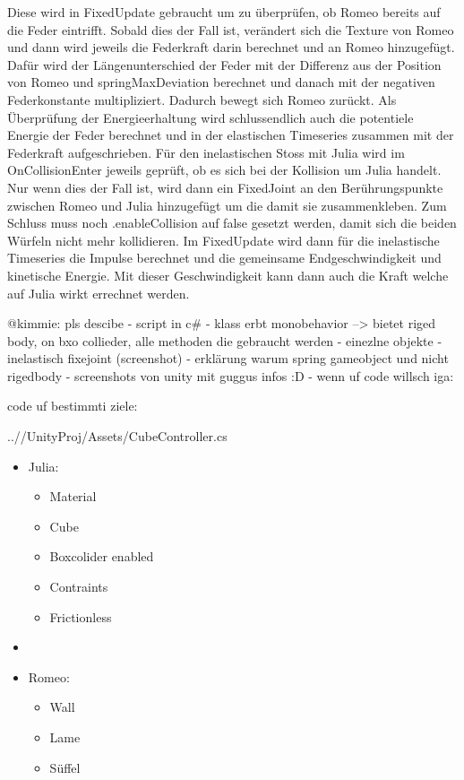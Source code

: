 \documentclass[../main.tex]{subfiles}
\begin{document}
Diese wird in FixedUpdate gebraucht um zu überprüfen, ob Romeo bereits auf die Feder eintrifft.
Sobald dies der Fall ist, verändert sich die Texture von Romeo und dann wird jeweils die Federkraft darin
berechnet und an Romeo hinzugefügt. Dafür wird der Längenunterschied der Feder mit der Differenz aus der
Position von Romeo und springMaxDeviation berechnet und danach mit der negativen Federkonstante multipliziert.
Dadurch bewegt sich Romeo  zurückt. Als Überprüfung der Energieerhaltung wird schlussendlich auch die potentiele
Energie der Feder berechnet und in der elastischen Timeseries zusammen mit der Federkraft aufgeschrieben.
\newline
Für den inelastischen Stoss mit Julia wird im OnCollisionEnter jeweils geprüft, ob es sich bei der Kollision um
Julia handelt. Nur wenn dies der Fall ist, wird dann ein FixedJoint an den Berührungspunkte zwischen Romeo und
Julia hinzugefügt um die damit sie zusammenkleben. Zum Schluss muss noch .enableCollision auf false gesetzt werden,
damit sich die beiden Würfeln nicht mehr kollidieren.
\newline
Im FixedUpdate wird dann für die inelastische Timeseries die Impulse berechnet und die gemeinsame Endgeschwindigkeit
und kinetische Energie. Mit dieser Geschwindigkeit kann dann auch die Kraft welche auf Julia wirkt errechnet werden.


    @kimmie: pls descibe
    - script in c#
    - klass erbt monobehavior
    --> bietet riged body, on bxo collieder, alle methoden die gebraucht werden
    - einezlne objekte
    - inelastisch fixejoint (screenshot)
    - erklärung warum spring gameobject und nicht rigedbody
    - screenshots von unity mit guggus infos :D
    - wenn uf code willsch iga:


  code uf bestimmti ziele:
    \begin{lstinputlisting}[label={lst:graphInelastic}, firstline=7, lastline=12]
    {..//UnityProj/Assets/CubeController.cs}
    \end{lstinputlisting}

    \begin{itemize}
        \item Julia:
        \begin{itemize}
            \item Material
            \item Cube
            \item Boxcolider enabled
            \item Contraints
            \item Frictionless
        \end{itemize}

        \item \item Romeo:
        \begin{itemize}
            \item Wall
            \item Lame
            \item Süffel
        \end{itemize}
    \end{itemize}
\end{document}
